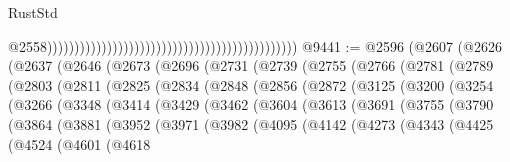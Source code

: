 \begin{lexlean}{RustStd}
\begin{coremodule}
                                                                                                @2558))))))))))))))))))))))))))))))))))))))))))))))
@9441 := @2596
    (@2607
      (@2626
        (@2637
          (@2646
            (@2673
              (@2696
                (@2731
                  (@2739
                    (@2755
                      (@2766
                        (@2781
                          (@2789
                            (@2803
                              (@2811
                                (@2825
                                  (@2834
                                    (@2848
                                      (@2856
                                        (@2872
                                          (@3125
                                            (@3200
                                              (@3254
                                                (@3266
                                                  (@3348
                                                    (@3414
                                                      (@3429
                                                        (@3462
                                                          (@3604
                                                            (@3613
                                                              (@3691
                                                                (@3755
                                                                  (@3790
                                                                    (@3864
                                                                      (@3881
                                                                        (@3952
                                                                          (@3971
                                                                            (@3982
                                                                              (@4095
                                                                                (@4142
                                                                                  (@4273
                                                                                    (@4343
                                                                                      (@4425
                                                                                        (@4524
                                                                                          (@4601
                                                                                            (@4618

\end{coremodule}
\end{lexlean}
